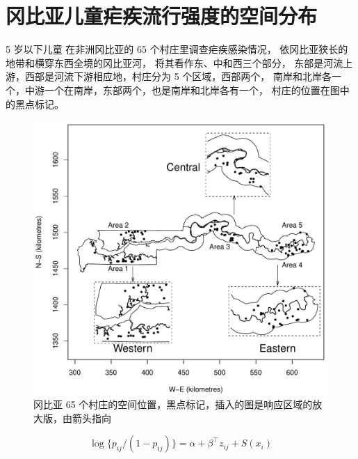 \documentclass[12pt,a4paper,UTF8,twoside]{book}
\theoremstyle{definition}
\theoremstyle{definition}
\theoremstyle{definition}
\theoremstyle{remark}
\begin{document}
\section{冈比亚儿童疟疾流行强度的空间分布}

5 岁以下儿童 在非洲冈比亚的 65 个村庄里调查疟疾感染情况，
依冈比亚狭长的地带和横穿东西全境的冈比亚河，
将其看作东、中和西三个部分，
东部是河流上游，西部是河流下游相应地，村庄分为 5 个区域，西部两个，
南岸和北岸各一个，中游一个在南岸，东部两个，也是南岸和北岸各有一个，
村庄的位置在图中的黑点标记。

\begin{figure}

{\centering \includegraphics[width=0.7\linewidth]{figures/gambia-map} 

}

\caption{冈比亚 65 个村庄的空间位置，黑点标记，插入的图是响应区域的放大版，由箭头指向}\label{fig:childhood-malaria}
\end{figure}

\begin{equation}
\log\{p_{ij}/(1-p_{ij})\} = \alpha + \beta^{\top}z_{ij} + S(x_i) \label{eq:gambia-without-nugget-effect}
\end{equation}
\end{document}

